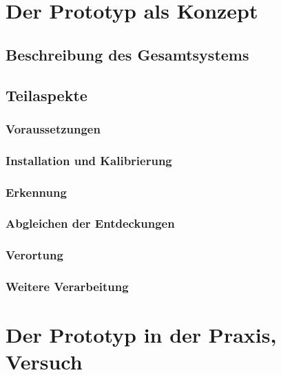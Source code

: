 \documentclass[a4paper,12pt]{report}
\begin{document}
\chapter{Der Prototyp als Konzept}\label{chap:der_prototyp_als_konzept}
	
	\section{Beschreibung des Gesamtsystems}\label{sec:beschreibung_gesamtsystem}
			
	\section{Teilaspekte}
		\subsection{Voraussetzungen}
			
		\subsection{Installation und Kalibrierung}\label{subsec:installation_kalibrierung}
			
		\subsection{Erkennung}\label{subsec:erkennung}
			
		\subsection{Abgleichen der Entdeckungen}\label{subsec:abgleichen_der_entdeckungen}
			
		\subsection{Verortung}
			
		\subsection{Weitere Verarbeitung}
			
\chapter{Der Prototyp in der Praxis, Versuch}\label{chap:der_prototyp_in_der_praxis_versuch}
	
\end{document}
